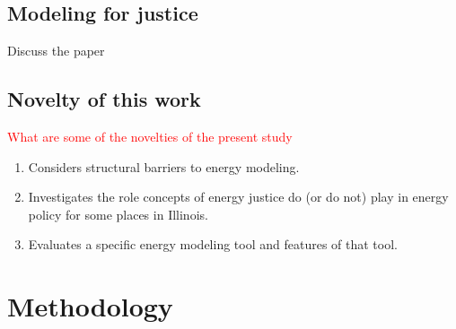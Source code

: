 \subsection{Modeling for justice}

Discuss the paper \cite{lonergan_energy_2023}

\subsection{Novelty of this work}

\textcolor{red}{What are some of the novelties of the present study}
\begin{enumerate}
    \item Considers structural barriers to energy modeling.
    \item Investigates the role concepts of energy justice do (or do not) play
    in energy policy for some places in Illinois.
    \item Evaluates a specific energy modeling tool and features of that tool.
\end{enumerate}
 

\section{Methodology}
\label{section:interview-methods}

